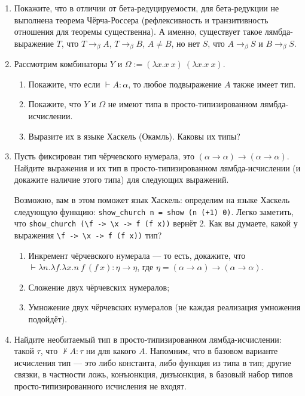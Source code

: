 \documentclass[10pt,a4paper,oneside]{article}
\begin{document}
\begin{enumerate}
\item Покажите, что в отличии от бета-редуцируемости, для бета-редукции не выполнена теорема Чёрча-Россера
(рефлексивность и транзитивность отношения для теоремы существенна).
А именно, существует такое лямбда-выражение $T$, что $T \rightarrow_\beta A$, $T \rightarrow_\beta B$,
$A \ne B$, но нет $S$, что $A \rightarrow_\beta S$ и $B \rightarrow_\beta S$.
\item Рассмотрим комбинаторы $Y$ и $\Omega := (\lambda x.x\ x)\ (\lambda x.x\ x)$.
\begin{enumerate} 
\item Покажите, что если $\vdash A : \alpha$, то любое подвыражение $A$ также имеет тип.
\item Покажите, что $Y$ и $\Omega$ не имеют типа в просто-типизированном лямбда-исчислении.
\item Выразите их в языке Хаскель (Окамль). Каковы их типы?
\end{enumerate}


\item Пусть фиксирован тип чёрчевского нумерала, это $(\alpha\rightarrow\alpha)\rightarrow(\alpha\rightarrow\alpha)$.
Найдите выражения и их тип в просто-типизированном лямбда-исчислении (и докажите наличие этого типа) для следующих выражений.

Возможно, вам в этом поможет язык Хаскель: определим на языке Хаскель следующую функцию: \verb!show_church n = show (n (+1) 0)!.
Легко заметить, что \verb!show_church (\f -> \x -> f (f x))! вернёт 2. Как вы думаете, какой у выражения \verb!\f -> \x -> f (f x))! тип?

\begin{enumerate}
\item Инкремент чёрчевского нумерала --- то есть, докажите, что
$\vdash \lambda n.\lambda f.\lambda x.n\ f\ (f\ x) : \eta\rightarrow\eta$, 
где $\eta = (\alpha\rightarrow\alpha)\rightarrow(\alpha\rightarrow\alpha)$.
\item Сложение двух чёрчевских нумералов;
\item Умножение двух чёрчевских нумералов (не каждая реализация умножения подойдёт).
\end{enumerate}


\item Найдите необитаемый тип в просто-типизированном лямбда-исчислении: такой $\tau$, что $\not\vdash A : \tau$ ни 
для какого $A$. Напомним, что в базовом варианте исчисления тип --- это либо константа, либо функция из типа в тип; 
другие связки, в частности ложь, конъюнкция, дизъюнкция, в базовый набор типов просто-типизированного исчисления не входят.


\end{enumerate}
\end{document}

